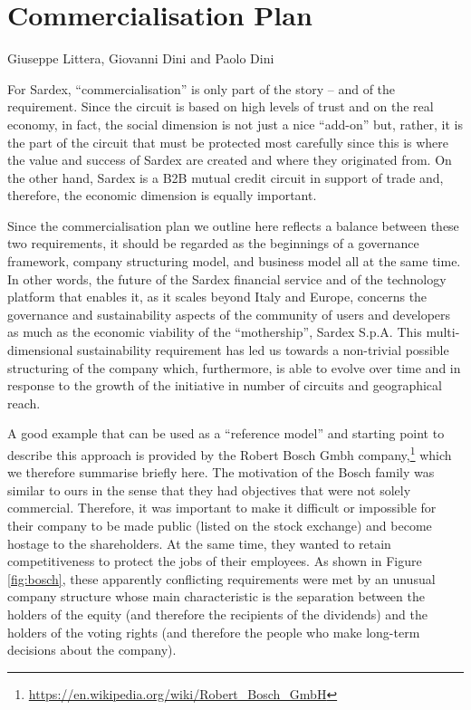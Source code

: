 \chapter{Commercialisation Plan}
\label{ch:commercialisation}

\vspace{-1cm}
\begin{center}
Giuseppe Littera, Giovanni Dini and Paolo Dini
\end{center}

For Sardex, ``commercialisation'' is only part of the story -- and of the requirement. Since the circuit is based on high levels of trust and on the real economy, in fact, the social dimension is not just a nice ``add-on'' but, rather, it is the part of the circuit that must be protected most carefully since this is where the value and success of Sardex are created and where they originated from. On the other hand, Sardex is a B2B mutual credit circuit in support of trade and, therefore, the economic dimension is equally important.

Since the commercialisation plan we outline here reflects a balance between these two requirements, it should be regarded as the beginnings of a governance framework, company structuring model, and business model all at the same time. In other words, the future of the Sardex financial service and of the technology platform that enables it, as it scales beyond Italy and Europe, concerns the governance and sustainability aspects of the community of users and developers as much as the economic viability of the ``mothership'', Sardex S.p.A. This multi-dimensional sustainability requirement has led us towards a non-trivial possible structuring of the company which, furthermore, is able to evolve over time and in response to the growth of the initiative in number of circuits and geographical reach.

A good example that can be used as a ``reference model'' and starting point to describe this approach is provided by the Robert Bosch Gmbh company,\footnote{\url{https://en.wikipedia.org/wiki/Robert_Bosch_GmbH}} which we therefore summarise briefly here. The motivation of the Bosch family was similar to ours in the sense that they had objectives that were not solely commercial. Therefore, it was important to make it difficult or impossible for their company to be made public (listed on the stock exchange) and become hostage to the shareholders. At the same time, they wanted to retain competitiveness to protect the jobs of their employees. As shown in Figure \ref{fig:bosch}, these apparently conflicting requirements were met by an unusual company structure whose main characteristic is the separation between the holders of the equity (and therefore the recipients of the dividends) and the holders of the voting rights (and therefore the people who make long-term decisions about the company).

